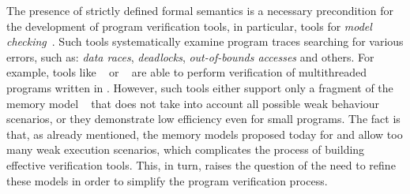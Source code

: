 The presence of strictly defined formal semantics is a necessary precondition for the development of program verification tools, in particular, tools for \emph{model checking}~\autocite{Baier:2008}.
Such tools systematically examine program traces searching for various errors, such as:
\emph{data races},
\emph{deadlocks},
\emph{out-of-bounds accesses} and others.
For example, tools like \genmc~\autocite{Kokologiannakis:CAD2021}
or \CDSChecker~\autocite{Norris-Demsky:OOPSLA2013} are able to perform verification of
multithreaded programs written in \CPP.
However, such tools either support only a fragment of the \CPP memory model ~\autocite{Lahav-al:PLDI17} that does not take into account all possible weak behaviour scenarios, or they demonstrate low efficiency even for small programs.
The fact is that, as already mentioned, the memory models proposed today for \CPP and \Java allow too many
weak execution scenarios, which complicates the process of building effective verification tools. This, in turn, raises the question of the need to refine these models
in order to simplify the program verification process.

